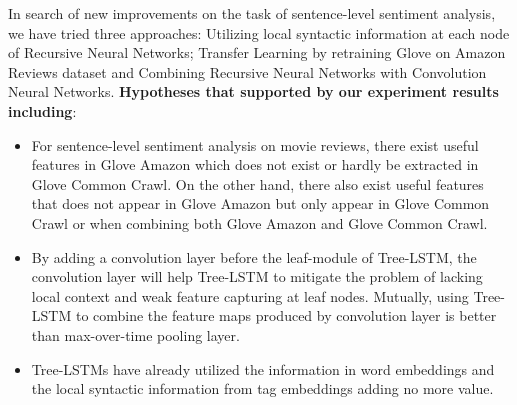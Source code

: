 In search of new improvements on the task of sentence-level sentiment analysis, we have tried three approaches: Utilizing local syntactic information at each node of Recursive Neural Networks; Transfer Learning by retraining Glove on Amazon Reviews dataset and Combining Recursive Neural Networks with Convolution Neural Networks.
\textbf{Hypotheses that supported by our experiment results including}:
\begin{itemize}
	\item For sentence-level sentiment analysis on movie reviews, there exist useful features in Glove Amazon which does not exist or hardly be extracted in Glove Common Crawl.
	On the other hand, there also exist useful features that does not appear in Glove Amazon but only appear in Glove Common Crawl or when combining both Glove Amazon and Glove Common Crawl.
	
	\item By adding a convolution layer before the leaf-module of Tree-LSTM, the convolution layer will help Tree-LSTM to mitigate the problem of lacking local context and weak feature capturing at leaf nodes.
	Mutually, using Tree-LSTM to combine the feature maps produced by convolution layer is better than max-over-time pooling layer.
	
	\item  Tree-LSTMs have already utilized the information in word embeddings and the local syntactic information from tag embeddings adding no more value. 
\end{itemize}
